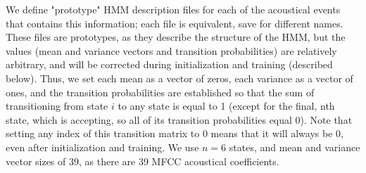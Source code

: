 \documentclass{wileySev}
\begin{document}
We define "prototype" HMM description files for each of the acoustical events that contains this information; each file is equivalent, save for different names. These files are prototypes, as they describe the structure of the HMM, but the values (mean and variance vectors and transition probabilities) are relatively arbitrary, and will be corrected during initialization and training (described below). Thus, we set each mean as a vector of zeros, each variance as a vector of ones, and the transition probabilities are established so that the sum of transitioning from state $i$ to any state is equal to 1 (except for the final, nth state, which is accepting, so all of its transition probabilities equal 0). Note that setting any index of this transition matrix to 0 means that it will always be 0, even after initialization and training. We use $n=6$ states, and mean and variance vector sizes of 39, as there are 39 MFCC acoustical coefficients.
\vskip 0.5in
\end{document}
